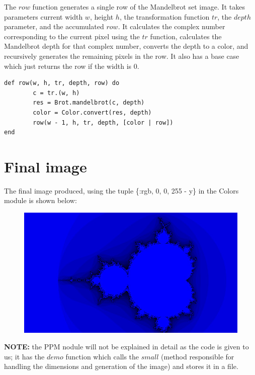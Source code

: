 \documentclass[a4paper,11pt]{article}
\begin{document}
The $row$ function generates a single row of the Mandelbrot set image. It takes parameters current width $w$, height $h$, the transformation function $tr$, the $depth$ parameter, and the accumulated $row$. It calculates the complex number corresponding to the current pixel using the $tr$ function, calculates the Mandelbrot depth for that complex number, converts the depth to a color, and recursively generates the remaining pixels in the row. It also has a base case which just returns the row if the width is 0.
\begin{verbatim}
def row(w, h, tr, depth, row) do 
        c = tr.(w, h)
        res = Brot.mandelbrot(c, depth)
        color = Color.convert(res, depth)
        row(w - 1, h, tr, depth, [color | row])
end
\end{verbatim}


\section*{Final image}
The final image produced, using the tuple \{:rgb, 0, 0, 255 - y\} in the Colors module is shown below:
\begin{figure}
    \centering
    \includegraphics{small (1).jpg}
\end{figure}

\textbf{NOTE:} the PPM nodule will not be explained in detail as the code is given to us; it has the $demo$ function which calls the  $small$ (method responsible for handling the dimensions and generation of the image) and stores it in a file.
\end{document}
